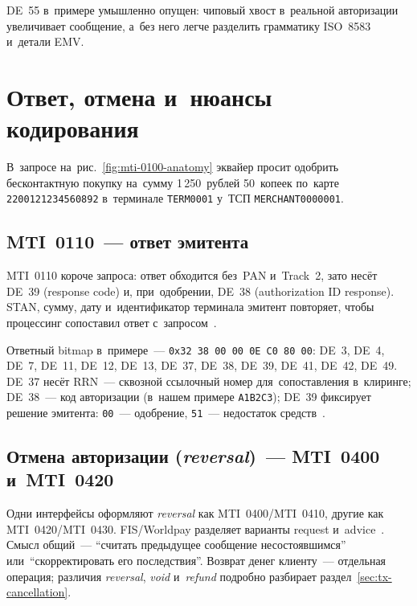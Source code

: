DE~55 в~примере умышленно опущен: чиповый хвост в~реальной авторизации
увеличивает сообщение, а~без него легче разделить грамматику ISO~8583
и~детали EMV.

\section{Ответ, отмена и~нюансы кодирования}\label{sec:iso8583-hex-dump}

В~запросе на~рис.~\ref{fig:mti-0100-anatomy} эквайер просит одобрить
бесконтактную покупку на~сумму 1\,250~рублей 50~копеек по~карте
\texttt{2200121234560892} в~терминале \texttt{TERM0001} у~ТСП
\texttt{MERCHANT0000001}.

\subsection*{MTI~0110~--- ответ эмитента}

MTI~0110 короче запроса: ответ обходится без~PAN и~Track~2, зато несёт DE~39
(response code) и, при~одобрении, DE~38 (authorization ID response). STAN,
сумму, дату и~идентификатор терминала эмитент повторяет, чтобы процессинг
сопоставил ответ с~запросом~\cite{fis-iso8583-guide-2023}.

Ответный bitmap в~примере~--- \texttt{0x32 38 00 00 0E C0 80
00}: DE~3, DE~4, DE~7, DE~11, DE~12, DE~13, DE~37, DE~38, DE~39, DE~41,
DE~42, DE~49. DE~37 несёт RRN~--- сквозной ссылочный номер для~сопоставления
в~клиринге; DE~38~--- код авторизации (в~нашем примере \texttt{A1B2C3}); DE~39
фиксирует решение эмитента: \texttt{00}~--- одобрение, \texttt{51}~---
недостаток средств~\cite{fis-iso8583-guide-2023}.

\subsection*{Отмена авторизации (\textit{reversal})~--- MTI~0400 и~MTI~0420}

Одни интерфейсы оформляют \textit{reversal} как MTI~0400/MTI~0410, другие как
MTI~0420/MTI~0430. FIS/Worldpay разделяет варианты request
и~advice~\cite{fis-iso8583-guide-2023}. Смысл общий~--- \enquote{считать
предыдущее сообщение несостоявшимся} или~\enquote{скорректировать его
последствия}. Возврат денег клиенту~--- отдельная операция; различия \textit{reversal},
\textit{void} и~\textit{refund} подробно разбирает раздел~\ref{sec:tx-cancellation}.


